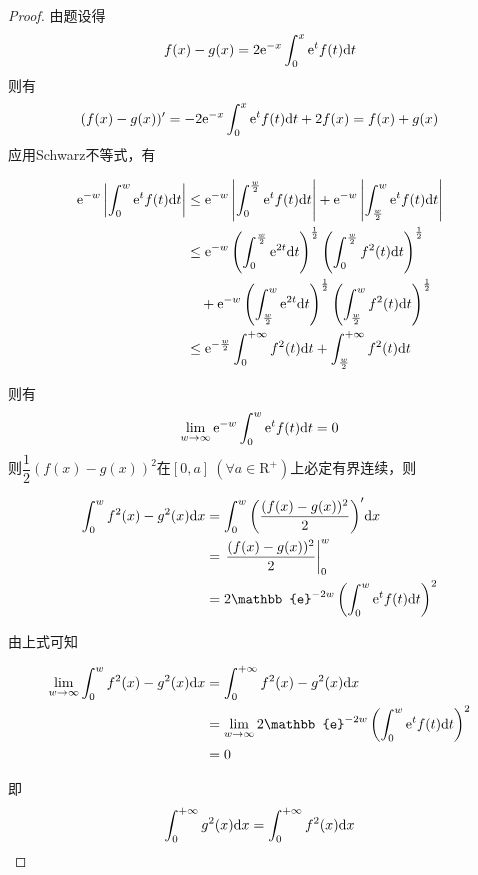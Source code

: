 \begin{proof}

    由题设得
    $$f(x) - g(x) = 2\mathrm{e}^{-x}\int_{0}^{x}{\mathrm{e}^tf(t)}\mathrm{d} t$$
    则有
    $$(f(x) - g(x))' = -2\mathrm{e}^{-x}\int_{0}^{x}{\mathrm{e}^tf(t)}\mathrm{d} t + 2f(x) = f(x) + g(x)$$
    应用\textup{Schwarz}不等式，有

    \begin{align*}
        \mathrm{e}^{-w} \left| \int_{0}^{w}{\mathrm{e}^tf(t)}\mathrm{d} t \right| & \leq \mathrm{e}^{-w} \left| \int_{0}^{\frac{w}{2}}{\mathrm{e}^tf(t)}\mathrm{d} t \right| + \mathrm{e}^{-w} \left| \int_{\frac{w}{2}}^{w}{\mathrm{e}^tf(t)}\mathrm{d} t \right| \\
        & \leq \mathrm{e}^{-w} \left( \int_{0}^{\frac{w}{2}}{\mathrm{e}^{2t}}\mathrm{d} t \right)^{\frac{1}{2}} \left( \int_{0}^{\frac{w}{2}}{f^2(t)}\mathrm{d} t \right)^{\frac{1}{2}} \\
        & \quad + \mathrm{e}^{-w} \left( \int_{\frac{w}{2}}^{w}{\mathrm{e}^{2t}}\mathrm{d} t \right)^{\frac{1}{2}} \left( \int_{\frac{w}{2}}^{w}{f^2(t)}\mathrm{d} t \right)^{\frac{1}{2}} \\
        & \leq \mathrm{e}^{-\frac{w}{2}} \int_{0}^{+\infty}{f^2(t)}\mathrm{d} t + \int_{\frac{w}{2}}^{+\infty}{f^2(t)}\mathrm{d} t
    \end{align*}

    则有
    $$\lim\limits_{w\to\infty}{\mathrm{e}^{-w}\int_{0}^{w}{\mathrm{e}^tf(t)}\mathrm{d} t} = 0$$
    则$\dfrac{1}{2}(f(x) - g(x))^2$在$[0,a]\ (\forall a \in \mathrm{R}^+)$上必定有界连续，则

    \begin{align*}
        \int_{0}^{w}{f^2(x) - g^2(x)}\diff x & = \int_{0}^{w}{\left( \dfrac{(f(x) - g(x))^2}{2}\right)'}\diff x \\
        & = \left. \dfrac{(f(x) - g(x))^2}{2} \right|_{0}^{w} \\ 
        & = 2 \mathbb{e}^{-2w} \left( \int_{0}^{w}{\euler^tf(t)}\diff t \right)^2
    \end{align*}

    由上式可知

    \begin{align*}
        \lim\limits_{w\to\infty}{\int_{0}^{w}{f^2(x) - g^2(x)}\diff x} & = \int_{0}^{+\infty}{f^2(x) - g^2(x)}\diff x \\
        & = \lim\limits_{w\to\infty}{2 \mathbb{e}^{-2w} \left( \int_{0}^{w}{\euler^tf(t)}\diff t \right)^2} \\
        & = 0
    \end{align*}

    即
    $$\int_{0}^{+\infty}{g^2(x)}\mathrm{d} x = \int_{0}^{+\infty}{f^2(x)}\mathrm{d} x$$

\end{proof}

